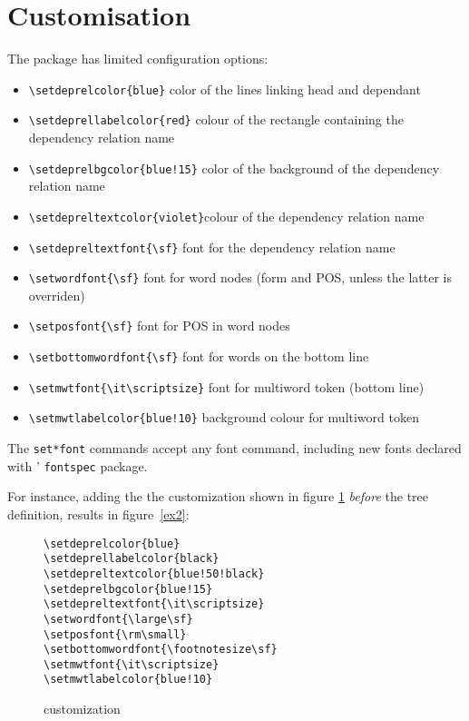 \documentclass[12pt]{article}
\begin{document}
\section{Customisation}
The package has limited configuration options:
\begin{itemize}
\item \verb:\setdeprelcolor{blue}: color of the lines linking head and
  dependant
\item \verb:\setdeprellabelcolor{red}: colour of the rectangle
  containing the dependency relation name
\item \verb:\setdeprelbgcolor{blue!15}: color of the background of the
  dependency relation name
  
\item \verb:\setdepreltextcolor{violet}:colour of the dependency relation name
\item \verb:\setdepreltextfont{\sf}: font for the dependency relation  name
\item \verb:\setwordfont{\sf}: font for word nodes (form and POS, unless the latter is overriden)
\item \verb:\setposfont{\sf}: font for POS in word nodes
\item \verb:\setbottomwordfont{\sf}: font for words on the bottom line
\item \verb:\setmwtfont{\it\scriptsize}: font for multiword token (bottom line)
\item \verb:\setmwtlabelcolor{blue!10}: background colour for multiword token
\end{itemize}

The \verb:set*font: commands accept any font command, including new
fonts declared with \XeLaTeX' \verb:fontspec: package.

For instance, adding the the customization shown in figure \ref{def2}
\emph{before} 
the tree definition, results in figure~\ref{ex2}:

\begin{figure}[H]
\begin{verbatim}
\setdeprelcolor{blue}
\setdeprellabelcolor{black}
\setdepreltextcolor{blue!50!black}
\setdeprelbgcolor{blue!15}    
\setdepreltextfont{\it\scriptsize}
\setwordfont{\large\sf}
\setposfont{\rm\small}
\setbottomwordfont{\footnotesize\sf}
\setmwtfont{\it\scriptsize}
\setmwtlabelcolor{blue!10}
\end{verbatim}
\caption{customization}\label{def2}
\end{figure}
\end{document}
